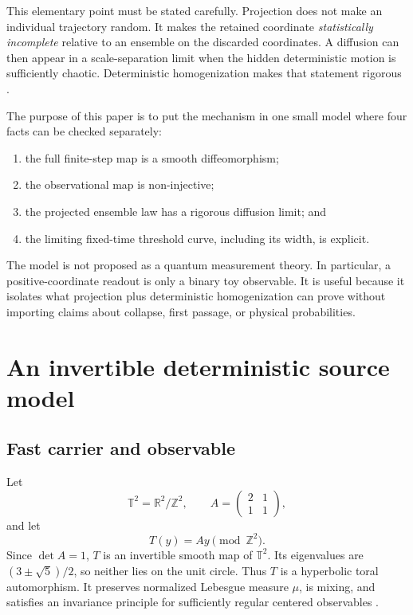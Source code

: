 \documentclass[11pt]{article}
\newcommand{\T}{\mathbb{T}}
\begin{document}
This elementary point must be stated carefully. Projection does not make an individual trajectory random. It makes the retained coordinate \emph{statistically incomplete} relative to an ensemble on the discarded coordinates. A diffusion can then appear in a scale-separation limit when the hidden deterministic motion is sufficiently chaotic. Deterministic homogenization makes that statement rigorous \cite{MelbourneStuart2011,GottwaldMelbourne2013,ChevyrevEtAl2022}.

The purpose of this paper is to put the mechanism in one small model where four facts can be checked separately:
\begin{enumerate}
\item the full finite-step map is a smooth diffeomorphism;
\item the observational map is non-injective;
\item the projected ensemble law has a rigorous diffusion limit; and
\item the limiting fixed-time threshold curve, including its width, is explicit.
\end{enumerate}

The model is not proposed as a quantum measurement theory. In particular, a positive-coordinate readout is only a binary toy observable. It is useful because it isolates what projection plus deterministic homogenization can prove without importing claims about collapse, first passage, or physical probabilities.

\section{An invertible deterministic source model}

\subsection{Fast carrier and observable}

Let
\[
\T^2=\mathbb{R}^2/\mathbb{Z}^2,\qquad
A=
\begin{pmatrix}
2&1\\
1&1
\end{pmatrix},
\]
and let
\[
T(y)=Ay\pmod{\mathbb{Z}^2}.
\]
Since \(\det A=1\), \(T\) is an invertible smooth map of \(\T^2\). Its eigenvalues are
\((3\pm\sqrt5)/2\), so neither lies on the unit circle. Thus \(T\) is a hyperbolic toral automorphism. It preserves normalized Lebesgue measure \(\mu\), is mixing, and satisfies an invariance principle for sufficiently regular centered observables
\cite{KatokHasselblatt1995}.
\end{document}
